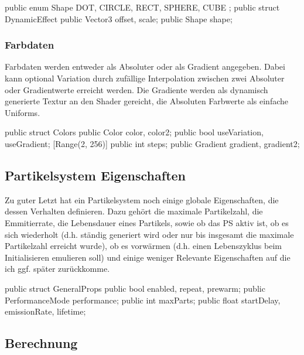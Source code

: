\begin{csh}[caption=DynamicEffect Struktur]
public enum Shape { DOT, CIRCLE, RECT, SPHERE, CUBE };
public struct DynamicEffect
{
    public Vector3 offset, scale;
    public Shape shape;
}
\end{csh}



\subsubsection{Farbdaten}

Farbdaten werden entweder als Absoluter oder als Gradient angegeben. Dabei kann optional Variation durch zufällige Interpolation zwischen zwei Absoluter oder Gradientwerte erreicht werden. Die Gradiente werden als dynamisch generierte Textur an den Shader gereicht, die Absoluten Farbwerte als einfache Uniforms.

\begin{csh}
public struct Colors
{
    public Color color, color2;
    public bool useVariation, useGradient;
    [Range(2, 256)] public int steps;
    public Gradient gradient, gradient2;
}
\end{csh}



\subsection{Partikelsystem Eigenschaften}

Zu guter Letzt hat ein Partikelsystem noch einige globale Eigenschaften, die dessen Verhalten definieren. Dazu gehört die maximale Partikelzahl, die Emmitierrate, die Lebensdauer eines Partikels, sowie ob das PS aktiv ist, ob es sich wiederholt (d.h. ständig generiert wird oder nur bis insgesamt die maximale Partikelzahl erreicht wurde), ob es vorwärmen (d.h. einen Lebenszyklus beim Initialisieren emulieren soll) und einige weniger Relevante Eigenschaften auf die ich ggf. später zurückkomme.

\begin{csh}[caption=Partikel Struktur]
public struct GeneralProps
{
    public bool enabled, repeat, prewarm;
    public PerformanceMode performance;
    public int maxParts;
    public float startDelay, emissionRate, lifetime;
}
\end{csh}



\subsection{Berechnung}


